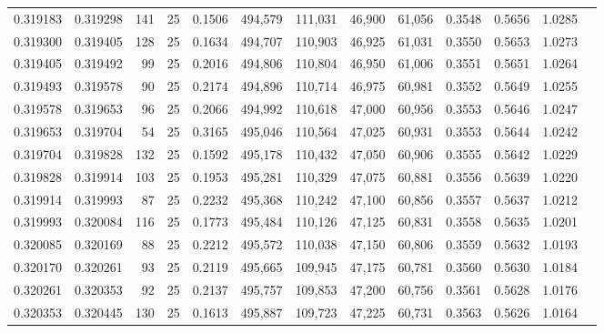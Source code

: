 \begin{tabular}{rrrrrrrrrrrrr}
0.319183 & 0.319298 &   141 &  25 &                                     0.1506 & 494,579 & 111,031 &  46,900 &  61,056 & 0.3548 & 0.5656 & 1.0285 \\
0.319300 & 0.319405 &   128 &  25 &                                     0.1634 & 494,707 & 110,903 &  46,925 &  61,031 & 0.3550 & 0.5653 & 1.0273 \\
0.319405 & 0.319492 &    99 &  25 &                                     0.2016 & 494,806 & 110,804 &  46,950 &  61,006 & 0.3551 & 0.5651 & 1.0264 \\
0.319493 & 0.319578 &    90 &  25 &                                     0.2174 & 494,896 & 110,714 &  46,975 &  60,981 & 0.3552 & 0.5649 & 1.0255 \\
0.319578 & 0.319653 &    96 &  25 &                                     0.2066 & 494,992 & 110,618 &  47,000 &  60,956 & 0.3553 & 0.5646 & 1.0247 \\
0.319653 & 0.319704 &    54 &  25 &                                     0.3165 & 495,046 & 110,564 &  47,025 &  60,931 & 0.3553 & 0.5644 & 1.0242 \\
0.319704 & 0.319828 &   132 &  25 &                                     0.1592 & 495,178 & 110,432 &  47,050 &  60,906 & 0.3555 & 0.5642 & 1.0229 \\
0.319828 & 0.319914 &   103 &  25 &                                     0.1953 & 495,281 & 110,329 &  47,075 &  60,881 & 0.3556 & 0.5639 & 1.0220 \\
0.319914 & 0.319993 &    87 &  25 &                                     0.2232 & 495,368 & 110,242 &  47,100 &  60,856 & 0.3557 & 0.5637 & 1.0212 \\
0.319993 & 0.320084 &   116 &  25 &                                     0.1773 & 495,484 & 110,126 &  47,125 &  60,831 & 0.3558 & 0.5635 & 1.0201 \\
0.320085 & 0.320169 &    88 &  25 &                                     0.2212 & 495,572 & 110,038 &  47,150 &  60,806 & 0.3559 & 0.5632 & 1.0193 \\
0.320170 & 0.320261 &    93 &  25 &                                     0.2119 & 495,665 & 109,945 &  47,175 &  60,781 & 0.3560 & 0.5630 & 1.0184 \\
0.320261 & 0.320353 &    92 &  25 &                                     0.2137 & 495,757 & 109,853 &  47,200 &  60,756 & 0.3561 & 0.5628 & 1.0176 \\
0.320353 & 0.320445 &   130 &  25 &                                     0.1613 & 495,887 & 109,723 &  47,225 &  60,731 & 0.3563 & 0.5626 & 1.0164 \\

\end{tabular}
